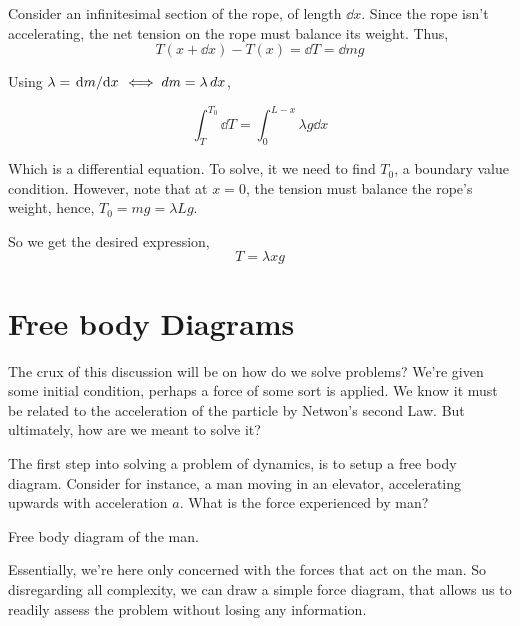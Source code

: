     \begin{soln}
        Consider an infinitesimal section of the rope, of length \(\dd{x}\). Since 
        the rope isn't accelerating, the net tension on the rope must balance its weight.
        Thus,
        \begin{equation*}
            T(x + \dd{x}) - T(x) = \dd{T} = \dd{m} g
        \end{equation*}

        Using \(\lambda = \dv*{m}{x} \iff \mathop{}\!{d}{m} = \lambda \mathop{}\!{d}{x}\),

        \begin{equation*}
            \int_{T}^{T_0} \dd{T} = \int_0^{L-x} \lambda g \dd{x}
        \end{equation*}

        Which is a differential equation. To solve, it we need to find \(T_0\), 
        a boundary value condition. However, note that at \(x = 0\), 
        the tension must balance the rope's weight, hence, \(T_0 = mg = \lambda Lg\).

        So we get the desired expression, \begin{equation*}
            T = \lambda xg
        \end{equation*}
    \end{soln}

\section{Free body Diagrams}

The crux of this discussion will be on how do we solve problems? We're given 
some initial condition, perhaps a force of some sort is applied. We know it must be 
related to the acceleration of the particle by Netwon's second Law. But ultimately, how are 
we meant to solve it?

The first step into solving a problem of dynamics, is to setup a free body diagram.
Consider for instance, a man moving in an elevator, accelerating upwards with acceleration 
\(a\). What is the force experienced by man?

\begin{marginfigure}
    \caption{Free body diagram of the man.}
\end{marginfigure}

Essentially, we're here only concerned with the forces that act on the man. So disregarding
all complexity, we can draw a simple force diagram, that allows us to readily assess 
the problem without losing any information.


